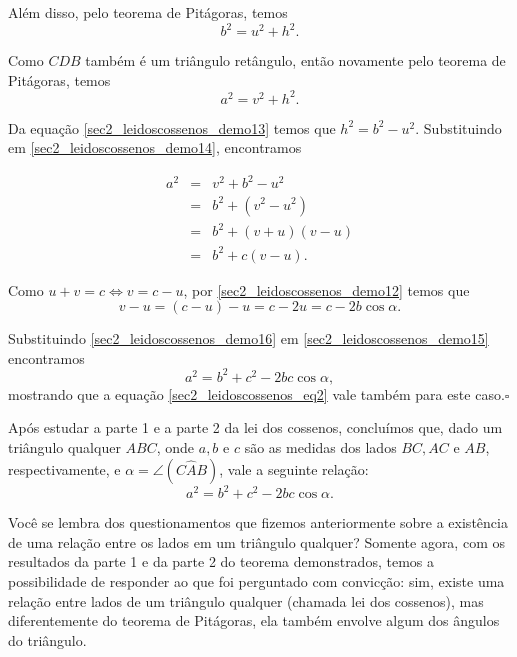 Além disso, pelo teorema de Pitágoras, temos
 \begin{equation} 
    b^2=u^2+h^2. \label{sec2_leidoscossenos_demo13}
\end{equation}

Como $CDB$ também é um triângulo retângulo, então novamente pelo teorema de Pitágoras, temos
\begin{equation}
    a^2=v^2+h^2. \label{sec2_leidoscossenos_demo14}
\end{equation}

Da equação \eqref{sec2_leidoscossenos_demo13} temos que $h^2=b^2-u^2$. Substituindo em \eqref{sec2_leidoscossenos_demo14}, encontramos

\begin{eqnarray}{}
   a^2 & = & v^2+b^2-u^2 \nonumber\\
       & = & b^2+(v^2-u^2) \nonumber \\
       & = & b^2+(v+u)(v-u) \nonumber\\
       & = & b^2+c(v-u).\label{sec2_leidoscossenos_demo15}
\end{eqnarray}

Como $u+v=c \iff v=c-u$, por \eqref{sec2_leidoscossenos_demo12} temos que
\begin{equation}
    v-u=(c-u)-u=c-2u= c-2b\cos\alpha. \label{sec2_leidoscossenos_demo16}
\end{equation}

Substituindo \eqref{sec2_leidoscossenos_demo16} em \eqref{sec2_leidoscossenos_demo15} encontramos
$$a^2=b^2+c^2-2bc\cos\alpha,$$
mostrando que a equação \eqref{sec2_leidoscossenos_eq2} vale também para este caso.\hspace{4.5cm}$\square$


Após estudar a parte 1 e a parte 2 da lei dos cossenos, concluímos que, dado um triângulo qualquer $ABC$, onde $a, b$ e $c$ são as medidas dos lados $BC, AC$ e $AB$, respectivamente, e $\alpha=\angle(C\hat{A}B)$, vale a seguinte relação:
$$a^2=b^2+c^2-2bc\cos\alpha.$$

Você se lembra dos questionamentos que fizemos anteriormente sobre a existência de uma relação entre os lados em um triângulo qualquer? Somente agora, com os resultados da parte 1 e da parte 2 do teorema demonstrados, temos a possibilidade de responder ao que foi perguntado com convicção: sim, existe uma relação entre lados de um triângulo qualquer (chamada lei dos cossenos), mas diferentemente do teorema de Pitágoras, ela também envolve algum dos ângulos do triângulo. 

